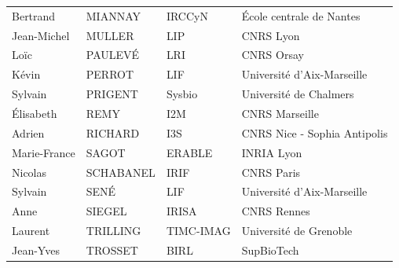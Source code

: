 \documentclass[10pt, a4paper]{article}
\begin{document}
{\begin{tabular}{llll}
		Bertrand & MIANNAY & IRCCyN & École centrale de Nantes\\
		Jean-Michel & MULLER & LIP & CNRS Lyon\\
		Loïc & PAULEVÉ & LRI & CNRS Orsay\\
		Kévin & PERROT & LIF & Université d'Aix-Marseille\\
		Sylvain & PRIGENT & Sysbio & Université de Chalmers\\
		Élisabeth & REMY & I2M & CNRS Marseille\\
		Adrien & RICHARD & I3S & CNRS Nice - Sophia Antipolis\\
		Marie-France & SAGOT & ERABLE & INRIA Lyon\\
		Nicolas & SCHABANEL & IRIF & CNRS Paris\\
		Sylvain & SENÉ & LIF & Université d'Aix-Marseille\\
		Anne & SIEGEL & IRISA & CNRS Rennes\\
		Laurent & TRILLING & TIMC-IMAG & Université de Grenoble\\
		Jean-Yves & TROSSET & BIRL & SupBioTech
	\end{tabular}
}
\end{document}

